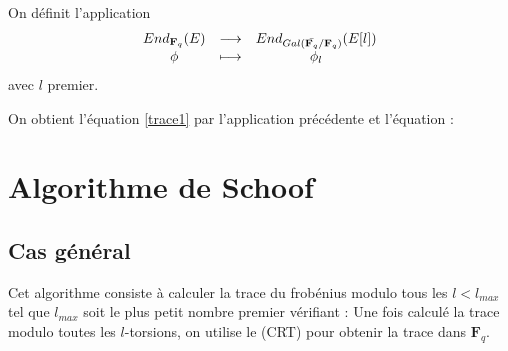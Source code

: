 \documentclass[french, lmodern]{beamer}
\newcommand\fq{\mathbf{F}_{q}}
\begin{document}
\begin{frame}
\transwipe
On définit l'application $$
\begin{array}{cl cl}
End_{\fq}(E)&\longrightarrow&End_{Gal(\bar{\fq}/\fq)}(E[l])\\
\phi&\longmapsto&\phi_{l}
\end{array}
$$ avec $l$ premier.
\pause

On obtient l'équation \eqref{trace1} par l'application précédente et l'équation  :


\end{frame}

\section{Algorithme de Schoof}
\subsection{Cas général}

\begin{frame}
\transwipe
Cet algorithme consiste à calculer la trace du frobénius modulo tous les $l<l_{max}$ tel que $l_{max}$ soit le plus petit nombre premier vérifiant :
Une fois calculé la trace modulo toutes les $l$-torsions, on utilise le  (CRT) pour obtenir la trace dans $\fq$.
\end{frame}
\end{document}
